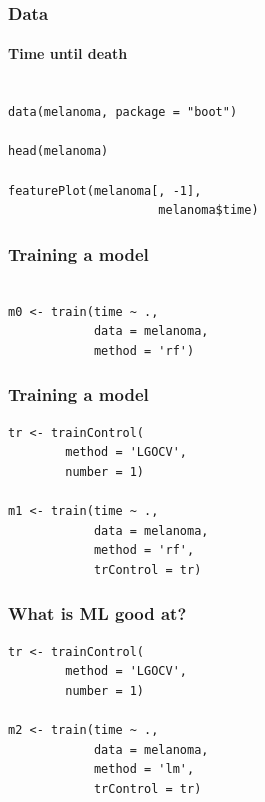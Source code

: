 \documentclass[handout, aspectratio = 169]{beamer}
\begin{document}
\begin{frame}[fragile]
\frametitle{Data}
\framesubtitle{Time until death}
\begin{Verbatim}

data(melanoma, package = "boot")

head(melanoma)

featurePlot(melanoma[, -1], 
                     melanoma$time)

\end{Verbatim}

\end{frame} 

\begin{frame}[fragile]
\frametitle{Training a model}
\begin{Verbatim}

m0 <- train(time ~ ., 
            data = melanoma,
            method = 'rf')

\end{Verbatim}

\end{frame} 


\begin{frame}[fragile]
\frametitle{Training a model}
\renewcommand{\FancyVerbFormatLine}[1]{%
   \ifnum\value{FancyVerbLine}=8\color{cyan}#1%
   \else #1\fi}
\begin{Verbatim}
tr <- trainControl(
        method = 'LGOCV',
        number = 1)

m1 <- train(time ~ ., 
            data = melanoma,
            method = 'rf',
            trControl = tr)

\end{Verbatim}

\end{frame} 


\begin{frame}[fragile]
\frametitle{What is ML good at?}
\renewcommand{\FancyVerbFormatLine}[1]{%
   \ifnum\value{FancyVerbLine}=7\color{cyan}#1%
   \else #1\fi}
\begin{Verbatim}
tr <- trainControl(
        method = 'LGOCV',
        number = 1)

m2 <- train(time ~ ., 
            data = melanoma,
            method = 'lm',
            trControl = tr)

\end{Verbatim}

\end{frame} 
\end{document}
